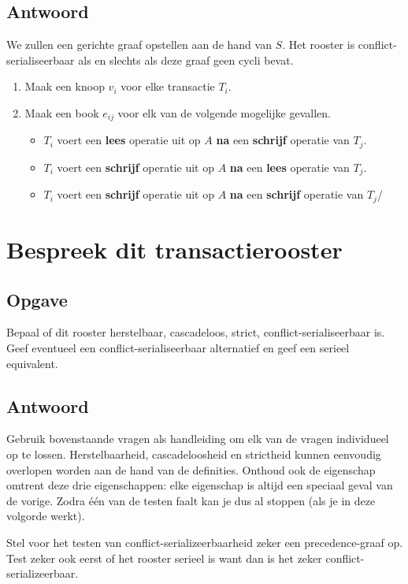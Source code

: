 \documentclass[transacties.tex]{subfiles}
\begin{document}
\subsection*{Antwoord}
We zullen een gerichte graaf opstellen aan de hand van $S$. Het rooster is conflict-serialiseerbaar als en slechts als deze graaf geen cycli bevat.
\begin{enumerate}
\item Maak een knoop $v_i$ voor elke transactie $T_i$.
\item Maak een book $e_{ij}$ voor elk van de volgende mogelijke gevallen.
\begin{itemize}
\item $T_i$ voert een \textbf{lees} operatie uit op $A$ \textbf{na} een \textbf{schrijf} operatie van $T_j$.
\item $T_i$ voert een \textbf{schrijf} operatie uit op $A$ \textbf{na} een \textbf{lees} operatie van $T_j$.
\item $T_i$ voert een \textbf{schrijf} operatie uit op $A$ \textbf{na} een \textbf{schrijf} operatie van $T_j$/
\end{itemize}
\end{enumerate}

\section{Bespreek dit transactierooster}
\subsection*{Opgave}
Bepaal of dit rooster herstelbaar, cascadeloos, strict, conflict-serialiseerbaar is. Geef eventueel een conflict-serialiseerbaar alternatief en geef een serieel equivalent.

\subsection*{Antwoord}
Gebruik bovenstaande vragen als handleiding om elk van de vragen individueel op te lossen. Herstelbaarheid, cascadeloosheid en strictheid kunnen eenvoudig overlopen worden aan de hand van de definities. Onthoud ook de eigenschap omtrent deze drie eigenschappen: elke eigenschap is altijd een speciaal geval van de vorige. Zodra \'e\'en van de testen faalt kan je dus al stoppen (als je in deze volgorde werkt).

Stel voor het testen van conflict-serializeerbaarheid zeker een precedence-graaf op. Test zeker ook eerst of het rooster serieel is want dan is het zeker conflict-serializeerbaar.
\end{document}
